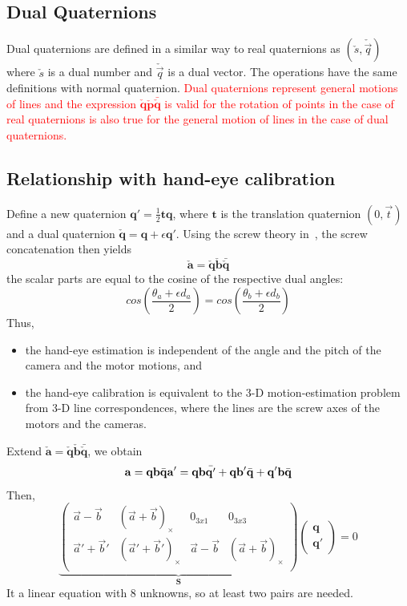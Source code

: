 \documentclass[a4paper]{report}
\begin{document}
\subsection{Dual Quaternions}
Dual quaternions are defined in a similar way to real quaternions
as $(\check{s}, \check{\vec{q}})$ where $\check{s}$ is a dual number and $\check{\vec{q}}$ is a dual vector. The operations have the same definitions with normal quaternion. \textcolor{red}{Dual quaternions represent general motions of lines and the expression $\check{\mathbf{q}}\check{\mathbf{p}}\bar{\check{\mathbf{q}}}$ is valid for the rotation of points in the case of real quaternions is also true for the general motion of lines in the case of dual quaternions.}
\subsection{Relationship with hand-eye calibration}
Define a new quaternion $\mathbf{q}'=\frac{1}{2}\mathbf{t}\mathbf{q}$, where $\mathbf{t}$ is the translation quaternion $(0, \vec{t})$ and a dual quaternion $\check{\mathbf{q}}=\mathbf{q}+\epsilon \mathbf{q'}$. Using the screw theory in~\cite{daniilidis1999hand}, the screw concatenation then yields
$$
\check{\mathbf{a}}=\check{\mathbf{q}}\check{\mathbf{b}}\bar{\check{\mathbf{q}}}
$$
the scalar parts are equal to the cosine of the respective dual angles:
$$
cos(\frac{\theta_a+\epsilon d_a}{2})=cos(\frac{{\theta_b}+\epsilon d_b}{2})
$$
Thus, 
\begin{itemize}
\item the hand-eye estimation is independent of the angle and
the pitch of the camera and the motor motions, and
\item the hand-eye calibration is equivalent to the 3-D
motion-estimation problem from 3-D line correspondences,
where the lines are the screw axes of the motors
and the cameras.
\end{itemize}
Extend $\check{\mathbf{a}}=\check{\mathbf{q}}\check{\mathbf{b}}\bar{\check{\mathbf{q}}}$, we obtain
$$
\mathbf{a}=\mathbf{q}\mathbf{b}\bar{\mathbf{q}} \\
\mathbf{a'}=\mathbf{q}\mathbf{b}\bar{\mathbf{q}'} + \mathbf{q}\mathbf{b}'\bar{\mathbf{q}}+\mathbf{q}'\mathbf{b}\bar{\mathbf{q}}\\
$$
Then, 
$$
\underbrace{
\left(
\begin{matrix}
\vec{a}-\vec{b} & (\vec{a}+\vec{b})_{\times} & 0_{3x1} & 0_{3x3} \\
\vec{a}'+\vec{b}' & (\vec{a}'+\vec{b}')_{\times} & \vec{a}-\vec{b} & (\vec{a}+\vec{b})_{\times} \\
\end{matrix}
\right)}_{\mathbf{S}}
\left(
\begin{matrix}
\mathbf{q} \\
\mathbf{q}'
\end{matrix}
\right)=0
$$
It a linear equation with $8$ unknowns, so at least two pairs are needed.
\end{document}
